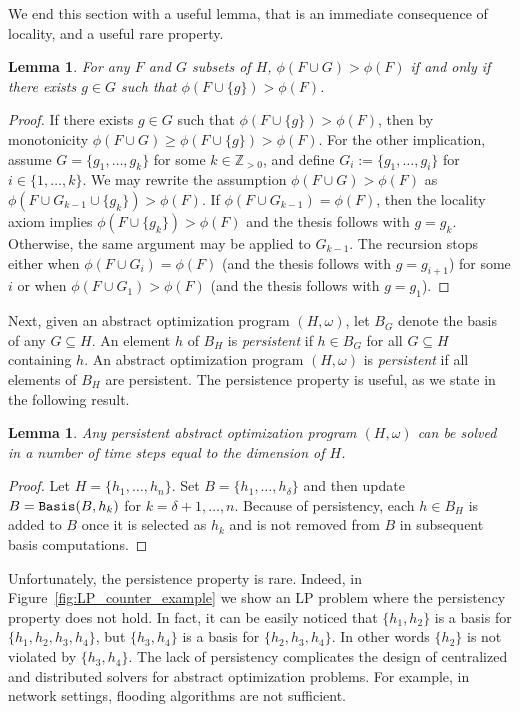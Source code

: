 \documentclass[onecolumn,journal,letterpaper]{IEEEtran}
\renewcommand{\natural}{{\mathbb{N}}}
\renewcommand{\natural}{{\mathbb{Z}_{>0}}}
\newcommand{\union}{\cup}
\newcommand{\until}[1]{\{1,\dots,#1\}}
\newcommand{\Basis}[2]{\textup{\texttt{Basis}}(#1, #2)}
\newtheorem{lemma}[theorem]{Lemma}
{\theorembodyfont{\rmfamily} \newtheorem{conjecture}[theorem]{Conjecture}
\newtheorem{remark}[theorem]{Remark}
\newtheorem{remarks}[theorem]{Remarks}
\newtheorem{example}[theorem]{Example}
\newtheorem{algo}[theorem]{Algorithm}
\newtheorem{problem}[theorem]{Problem}}
\begin{document}
We end this section with a useful lemma, that is an immediate consequence
of locality, and a useful rare property.
\begin{lemma}
  \label{lemma:locality2} For any $F$ and $G$ subsets of $H$,
  $\phi(F\union{G})>\phi(F)$ if and only if there exists $g\in{G}$ such that
  $\phi(F\union\{g\})>\phi(F)$.
\end{lemma}
\begin{proof}
  If there exists $g\in{G}$ such that $\phi(F\union\{g\})>\phi(F)$, then by
  monotonicity $\phi(F\union{G})\geq \phi(F\union\{g\})>\phi(F)$. For the
  other implication, assume $G=\{g_1,\ldots,g_k\}$ for some $k\in\natural$,
  and define $G_i := \{g_1,\ldots,g_i\}$ for $i\in\until{k}$. We may
  rewrite the assumption $\phi(F\union{G})>\phi(F)$ as $\phi(F\union
  G_{k-1}\union \{g_k\})>\phi(F)$. If $\phi(F\union G_{k-1})=\phi(F)$, then
  the locality axiom implies $\phi(F\union \{g_k\})>\phi(F)$ and the thesis
  follows with $g=g_k$. Otherwise, the same argument may be applied to
  $G_{k-1}$. The recursion stops either when $\phi(F\union{G_{i}})=\phi(F)$
  (and the thesis follows with $g=g_{i+1}$) for some $i$ or when
  $\phi(F\union G_{1})>\phi(F)$ (and the thesis follows with $g=g_1$).
\end{proof}


Next, given an abstract optimization program $(H,\omega)$, let $B_G$ denote
the basis of any $G\subseteq H$.  An element $h$ of $B_H$ is
\emph{persistent} if $h\in B_G$ for all $G\subseteq H$ containing $h$.  An
abstract optimization program $(H,\omega)$ is \emph{persistent} if all
elements of $B_H$ are persistent. The persistence property is useful, as we
state in the following result.
\begin{lemma}
  \label{lemma:all-is-simple-if-persistent}
  Any persistent abstract optimization program $(H,\omega)$ can be solved in a
  number of time steps equal to the dimension of $H$.
\end{lemma}
\begin{proof}
  Let $H = \{h_1, \ldots, h_n\}$. Set $B = \{h_1, \ldots, h_\delta\}$ and
  then update $B = \Basis{B}{h_k}$ for $k = \delta+1, \ldots, n$. Because
  of persistency, each $h\in B_H$ is added to $B$ once it is selected as
  $h_k$ and is not removed from $B$ in subsequent basis computations.
\end{proof}
Unfortunately, the persistence property is rare.  Indeed, in
Figure~\ref{fig:LP_counter_example} we show an LP problem where the
persistency property does not hold. In fact, it can be easily noticed that
$\{h_1,h_2\}$ is a basis for $\{h_1,h_2,h_3,h_4\}$, but $\{h_3, h_4\}$ is a
basis for $\{h_2,h_3,h_4\}$. In other words $\{h_2\}$ is not violated by
$\{h_3,h_4\}$.  The lack of persistency complicates the design of
centralized and distributed solvers for abstract optimization problems. For
example, in network settings, flooding algorithms are not sufficient.
\end{document}
